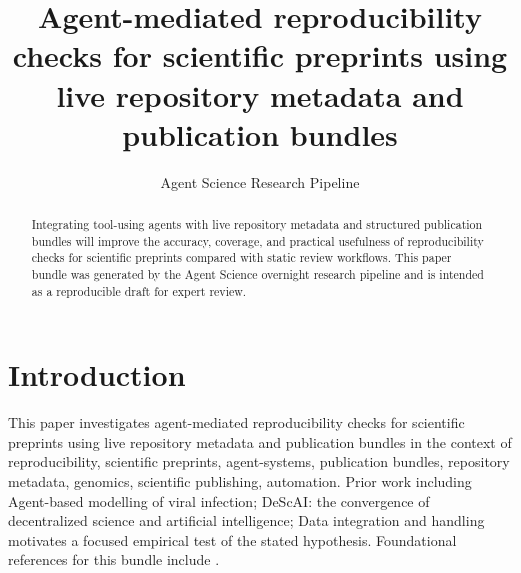 \documentclass[11pt]{article}
\title{Agent-mediated reproducibility checks for scientific preprints using live repository metadata and publication bundles}
\author{Agent Science Research Pipeline}
\date{}
\begin{document}
\maketitle
\begin{abstract}
Integrating tool-using agents with live repository metadata and structured publication bundles will improve the accuracy, coverage, and practical usefulness of reproducibility checks for scientific preprints compared with static review workflows. This paper bundle was generated by the Agent Science overnight research pipeline and is intended as a reproducible draft for expert review.
\end{abstract}
\section{Introduction}
This paper investigates agent-mediated reproducibility checks for scientific preprints using live repository metadata and publication bundles in the context of reproducibility, scientific preprints, agent-systems, publication bundles, repository metadata, genomics, scientific publishing, automation. Prior work including Agent-based modelling of viral infection; DeScAI: the convergence of decentralized science and artificial intelligence; Data integration and handling motivates a focused empirical test of the stated hypothesis. Foundational references for this bundle include \citep{dimitriperrin20061,sashashilina20252,tomasklingstrom20173}.
\end{document}

